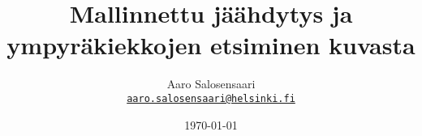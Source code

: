 \documentclass[11pt,a4paper,leqno]{report}
\newcommand{\Author}{Aaro Salosensaari}
\newcommand{\Title}{Mallinnettu jäähdytys ja ympyräkiekkojen etsiminen kuvasta}
\begin{document}
    \title{\Title}

    \author{\Author\\
        \small{ \texttt{\href{mailto:aaro.salosensaari@helsinki.fi}{aaro.salosensaari@helsinki.fi}}}
    }

    \date{\today}


    

    {\small
        \tableofcontents
    }

    
    
    
    
    
    

    \printbibliography[heading=bibintoc]
\end{document}
